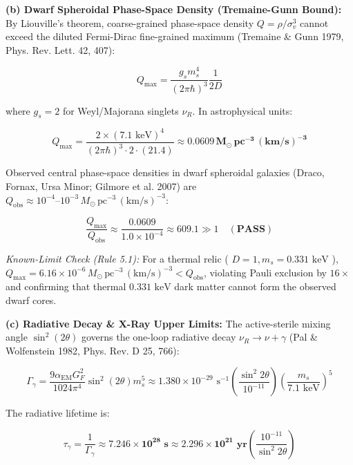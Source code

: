 \documentclass[11pt,a4paper]{article}
\theoremstyle{definition}
\theoremstyle{remark}
\begin{document}
\textbf{(b) Dwarf Spheroidal Phase-Space Density (Tremaine-Gunn Bound):}
By Liouville's theorem, coarse-grained phase-space density $Q = \rho / \sigma_v^3$ cannot exceed the diluted Fermi-Dirac fine-grained maximum (Tremaine \& Gunn 1979, Phys. Rev. Lett. 42, 407):


\begin{equation}
Q_{\text{max}} = \frac{g_s m_s^4}{(2\pi\hbar)^3} \frac{1}{2 D}
\end{equation}


where $g_s = 2$ for Weyl/Majorana singlets $\nu_R$. In astrophysical units:


\begin{equation}
Q_{\text{max}} = \frac{2 \times (7.1\text{ keV})^4}{(2\pi\hbar)^3 \cdot 2 \cdot (21.4)} \approx \mathbf{0.0609 \, M_\odot \, \text{pc}^{-3} \, (\text{km/s})^{-3}}
\end{equation}


Observed central phase-space densities in dwarf spheroidal galaxies (Draco, Fornax, Ursa Minor; Gilmore et al. 2007) are $Q_{\text{obs}} \approx 10^{-4}\text{--}10^{-3} \, M_\odot \, \text{pc}^{-3} \, (\text{km/s})^{-3}$:


\begin{equation}
\frac{Q_{\text{max}}}{Q_{\text{obs}}} \approx \frac{0.0609}{1.0 \times 10^{-4}} \approx \mathbf{609.1} \gg 1 \quad (\mathbf{PASS})
\end{equation}


\textit{Known-Limit Check (Rule 5.1):} For a thermal relic ( $D=1, m_s = 0.331\text{ keV}$ ), $Q_{\text{max}} = 6.16 \times 10^{-6} \, M_\odot \, \text{pc}^{-3} \, (\text{km/s})^{-3} < Q_{\text{obs}}$, violating Pauli exclusion by $16\times$ and confirming that thermal $0.331\text{ keV}$ dark matter cannot form the observed dwarf cores.

\textbf{(c) Radiative Decay \& X-Ray Upper Limits:}
The active-sterile mixing angle $\sin^2(2\theta)$ governs the one-loop radiative decay $\nu_R \to \nu + \gamma$ (Pal \& Wolfenstein 1982, Phys. Rev. D 25, 766):


\begin{equation}
\Gamma_\gamma = \frac{9 \alpha_{\text{EM}} G_F^2}{1024 \pi^4} \sin^2(2\theta) m_s^5 \approx 1.380 \times 10^{-29}\text{ s}^{-1} \left(\frac{\sin^2 2\theta}{10^{-11}}\right) \left(\frac{m_s}{7.1\text{ keV}}\right)^5
\end{equation}


The radiative lifetime is:


\begin{equation}
\tau_\gamma = \frac{1}{\Gamma_\gamma} \approx \mathbf{7.246 \times 10^{28}\text{ s}} \approx \mathbf{2.296 \times 10^{21}\text{ yr}} \left(\frac{10^{-11}}{\sin^2 2\theta}\right)
\end{equation}
\end{document}
